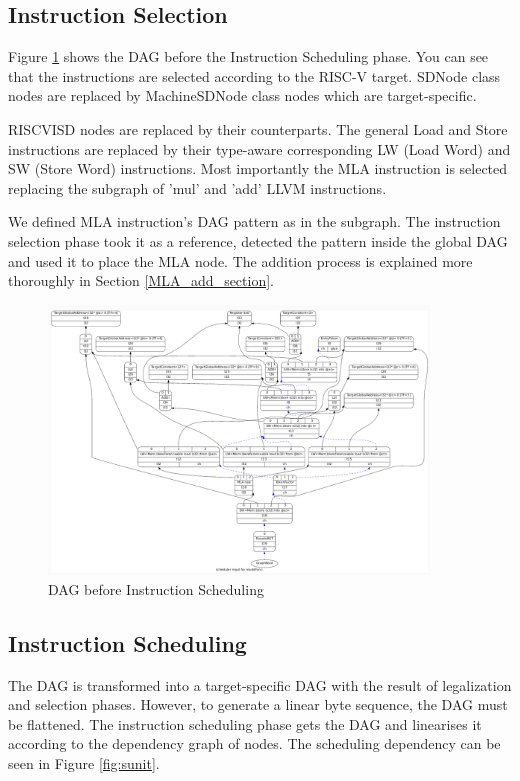 \subsection{Instruction Selection}
Figure \ref{fig:dag_sched} shows the DAG before the Instruction Scheduling phase. You can see that the instructions are selected according to the RISC-V target. SDNode class nodes are replaced by MachineSDNode class nodes which are target-specific.
\par
RISCVISD nodes are replaced by their counterparts. The general Load and Store instructions are replaced by their type-aware corresponding LW (Load Word) and SW (Store Word) instructions. Most importantly the MLA instruction is selected replacing the subgraph of 'mul' and 'add' LLVM instructions. 
\par
We defined MLA instruction's DAG pattern as in the subgraph. The instruction selection phase took it as a reference, detected the pattern inside the global DAG and used it to place the MLA node. The addition process is explained more thoroughly in Section \ref{MLA_add_section}.

\begin{figure}
    \centering
    \includegraphics[width=0.9\textwidth]{path_instruction/madd_dag_sched.png}
    \caption{DAG before Instruction Scheduling}
    \label{fig:dag_sched}
\end{figure}

\subsection{Instruction Scheduling}
The DAG is transformed into a target-specific DAG with the result of legalization and selection phases. However, to generate a linear byte sequence, the DAG must be flattened. The instruction scheduling phase gets the DAG and linearises it according to the dependency graph of nodes. The scheduling dependency can be seen in Figure \ref{fig:sunit}.

